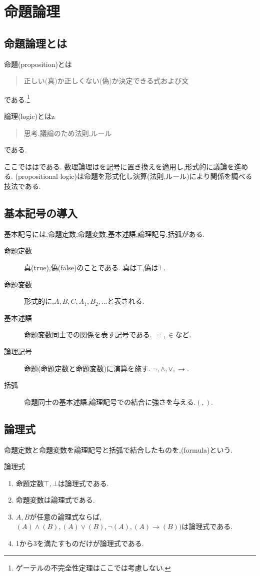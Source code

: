 \chapter{命題論理}
\section{命題論理とは}
命題(proposition)とは
\begin{quotation}
 正しい(真)か正しくない(偽)か決定できる式および文
\end{quotation}
である.\footnote{ゲーテルの不完全性定理はここでは考慮しない.}

論理(logic)とはz
\begin{quotation}
 思考,議論のため法則,ルール
\end{quotation}
である.

ここでははである.
数理論理はを記号に置き換えを適用し,形式的に議論を進める.
(propositional logic)は命題を形式化し演算(法則,ルール)により関係を調べる技法である.

\section{基本記号の導入}
基本記号には,命題定数,命題変数,基本述語,論理記号,括弧がある.
\begin{description}
 \item[命題定数] 真(true),偽(false)のことである. 真は$\top$,偽は$\bot$.
 \item[命題変数] 形式的に,$A,B,C,A_1,B_2,...$と表される.
 \item[基本述語] 命題変数同士での関係を表す記号である. $=,\in$など.
 \item[論理記号] 命題(命題定数と命題変数)に演算を施す. $\lnot,\land,\lor,\to$.
 \item[括弧] 命題同士の基本述語,論理記号での結合に強さを与える.$(,)$.
\end{description}
\newpage

\section{論理式}
命題定数と命題変数を論理記号と括弧で結合したものを,(formula)という.
\begin{dfn}
 論理式
 \begin{enumerate}
  \item 命題定数$\top,\bot$は論理式である.
  \item 命題変数は論理式である.
  \item $A,B$が任意の論理式ならば,$(A) \land (B),(A) \lor (B), \lnot (A), (A) \to (B))$は論理式である.
  \item 1から3を満たすものだけが論理式である.
 \end{enumerate}
\end{dfn}

